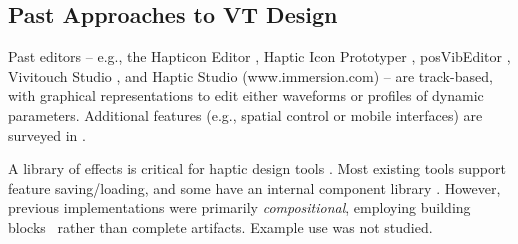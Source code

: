 
\subsection{Past Approaches to VT Design}
Past editors -- e.g., the Hapticon Editor \cite{Enriquez2003}, Haptic Icon Prototyper \cite{Swindells2006}, posVibEditor \cite{Ryu2008}, Vivitouch Studio \cite{Swindells2014}, and Haptic Studio (www.immersion.com) -- are track-based, with graphical representations to edit either waveforms or profiles of dynamic parameters.
Additional features (e.g., spatial control or mobile interfaces) are surveyed in \cite{Schneider2015}.

A library of effects is critical for haptic design tools \cite{Schneider2015}. Most existing tools support feature saving/loading, and some have an internal component library \cite{Enriquez2003,Swindells2006,Swindells2014}.
However, previous implementations were primarily \emph{compositional}, employing building blocks~\cite{Enriquez2006} %
rather than complete artifacts. Example use was not studied.

